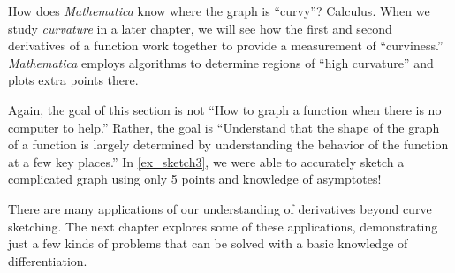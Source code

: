 How does \textit{Mathematica} know where the graph is ``curvy''? Calculus. When we study \textit{curvature} in a later chapter, we will see how the first and second derivatives of a function work together to provide a measurement of ``curviness.'' \textit{Mathematica} employs algorithms to determine regions of ``high curvature'' and plots extra points there.

Again, the goal of this section is not ``How to graph a function when there is no computer to help.'' Rather, the goal is ``Understand that the shape of the graph of a function is largely determined by understanding the behavior of the function at a few key places.'' In \autoref{ex_sketch3}, we were able to accurately sketch a complicated graph using only 5 points and knowledge of asymptotes!

There are many applications of our understanding of derivatives beyond curve sketching. The next chapter explores some of these applications, demonstrating just a few kinds of problems that can be solved with a basic knowledge of differentiation. 


